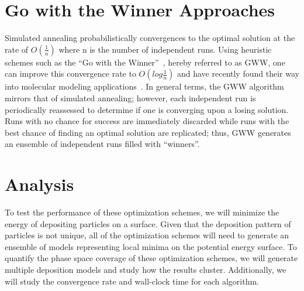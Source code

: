 \documentclass[12pt,onecolumn,notitlepage]{article}
\begin{document}
\section{Go with the Winner Approaches}
Simulated annealing probabilistically convergences to the optimal solution at the rate
 of $O(\frac{1}{n})$ where n is the number of independent runs.  
Using heuristic schemes such as the ``Go with the Winner''~\cite{Aldous1994gwt}, hereby referred to as GWW, 
one can improve this convergence rate to $O(log \frac{1}{n})$ and have recently found their way into molecular modeling applications~\cite{Peinado1997gwt}.  In general terms, the GWW algorithm mirrors that of simulated annealing; however, each independent run is periodically reassessed to determine if one is converging upon a losing solution.  Runs with 
no chance for success are immediately discarded while runs with the best chance of finding an optimal solution
are replicated; thus, GWW generates an ensemble of independent runs filled with  ``winners''.  

\section{Analysis}
To test the performance of these optimization schemes, we will minimize the energy of depositing particles on a surface.  Given that the deposition pattern of particles is not unique, all of the optimization schemes will need to generate an ensemble of models representing local minima on the potential energy surface.  To quantify the phase space coverage of these optimization schemes, we will generate multiple deposition models and study how the results cluster.  Additionally, we will study the convergence rate and wall-clock time for each algorithm.



\end{document}
